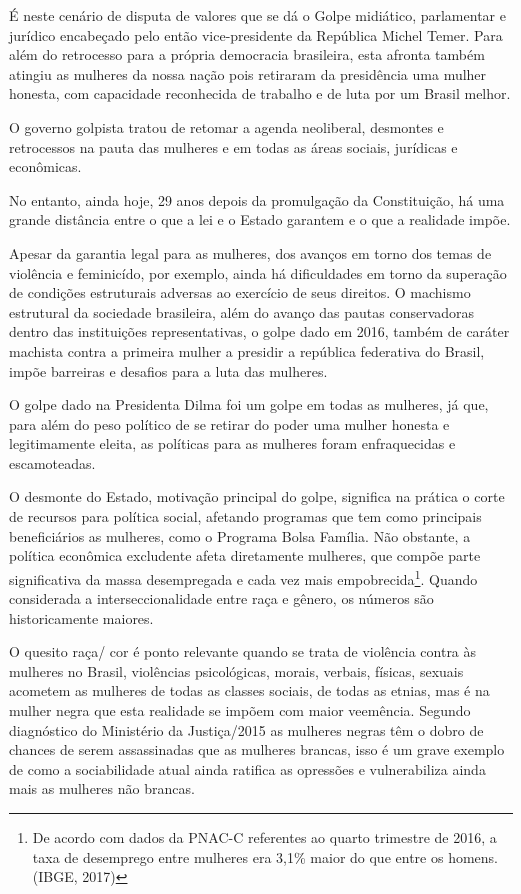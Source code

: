 É neste cenário de disputa de valores que se dá o Golpe midiático,
parlamentar e jurídico encabeçado pelo então vice-presidente da
República Michel Temer. Para além do retrocesso para a própria
democracia brasileira, esta afronta também atingiu as mulheres da nossa
nação pois retiraram da presidência uma mulher honesta, com capacidade
reconhecida de trabalho e de luta por um Brasil melhor.

O governo golpista tratou de retomar a agenda neoliberal, desmontes e
retrocessos na pauta das mulheres e em todas as áreas sociais, jurídicas
e econômicas.

No entanto, ainda hoje, 29 anos depois da promulgação da Constituição,
há uma grande distância entre o que a lei e o Estado garantem e o que a
realidade impõe.

Apesar da garantia legal para as mulheres, dos avanços em torno dos
temas de violência e feminicído, por exemplo, ainda há dificuldades em
torno da superação de condições estruturais adversas ao exercício de
seus direitos. O machismo estrutural da sociedade brasileira, além do
avanço das pautas conservadoras dentro das instituições representativas,
o golpe dado em 2016, também de caráter machista contra a primeira
mulher a presidir a república federativa do Brasil, impõe barreiras e
desafios para a luta das mulheres.

O golpe dado na Presidenta Dilma foi um golpe em todas as mulheres, já
que, para além do peso político de se retirar do poder uma mulher
honesta e legitimamente eleita, as políticas para as mulheres foram
enfraquecidas e escamoteadas.

O desmonte do Estado, motivação principal do golpe, significa na prática
o corte de recursos para política social, afetando programas que tem
como principais beneficiários as mulheres, como o Programa Bolsa
Família. Não obstante, a política econômica excludente afeta diretamente
mulheres, que compõe parte significativa da massa desempregada e cada
vez mais empobrecida\footnote{De acordo com dados da PNAC-C referentes
  ao quarto trimestre de 2016, a taxa de desemprego entre mulheres era
  3,1\% maior do que entre os homens. (IBGE, 2017)}. Quando considerada
a interseccionalidade entre raça e gênero, os números são historicamente
maiores.

O quesito raça/ cor é ponto relevante quando se trata de violência
contra às mulheres no Brasil, violências psicológicas, morais, verbais,
físicas, sexuais acometem as mulheres de todas as classes sociais, de
todas as etnias, mas é na mulher negra que esta realidade se impõem com
maior veemência. Segundo diagnóstico do Ministério da Justiça/2015 as
mulheres negras têm o dobro de chances de serem assassinadas que as
mulheres brancas, isso é um grave exemplo de como a sociabilidade atual
ainda ratifica as opressões e vulnerabiliza ainda mais as mulheres não
brancas.

